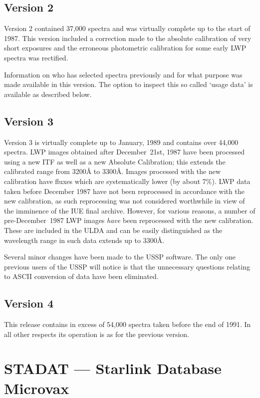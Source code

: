 \documentclass[11pt,nolof,noabs]{starlink}
\begin{document}
\subsection {Version 2}

Version 2  contained 37,000 spectra and was virtually complete
up to the start of 1987.
This version included a correction made to the absolute calibration
of very short exposures
and the erroneous photometric calibration for some early
LWP spectra was rectified.

Information on who has selected spectra previously and for what purpose was
made available in this version.
The option to inspect this so called `usage data'  is available
as described below.

\subsection{Version 3}

Version 3 is virtually complete up to January,  1989 and contains
over  44,000 spectra.
LWP images obtained after December~21st, 1987 have been processed using
a new  ITF  as  well  as  a  new  Absolute  Calibration;
this  extends  the  calibrated  range  from 3200{\AA}
to  3300{\AA}.
Images processed with the  new  calibration have fluxes which are
systematically lower (by about 7\%).
LWP data taken before December 1987 have not been reprocessed in
accordance with the new calibration, as
such reprocessing was not considered worthwhile in view
of the imminence of the IUE final archive.
However, for various reasons, a number of pre-December~1987 LWP images
{\sl have\/} been reprocessed with the new calibration.
These are included in the ULDA and can be easily distinguished as the
wavelength range  in such data extends up to 3300{\AA}.

Several minor changes have been made to the USSP software.
The only one previous
users of the USSP will notice is that the unnecessary questions relating to
ASCII conversion of data have been eliminated.

\subsection{Version 4}

This release contains in excess of 54,000 spectra taken before the
end of 1991. In all other respects its operation is as for the previous
version.



\section{STADAT --- Starlink Database Microvax}
\end{document}
